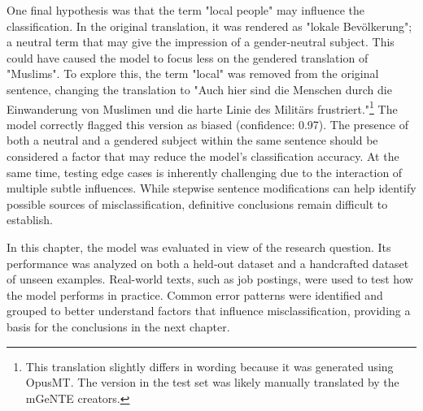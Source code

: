     One final hypothesis was that the term "local people" may influence the classification. In the original translation, it was rendered as "lokale Bevölkerung"; a neutral term that may give the impression of a gender-neutral subject. This could have caused the model to focus less on the gendered translation of "Muslims". To explore this, the term "local" was removed from the original sentence, changing the translation to "Auch hier sind die Menschen durch die Einwanderung von Muslimen und die harte Linie des Militärs frustriert."\footnote{This translation slightly differs in wording because it was generated using OpusMT. The version in the test set was likely manually translated by the mGeNTE creators.} The model correctly flagged this version as biased (confidence: 0.97). The presence of both a neutral and a gendered subject within the same sentence should be considered a factor that may reduce the model’s classification accuracy. At the same time, testing edge cases is inherently challenging due to the interaction of multiple subtle influences. While stepwise sentence modifications can help identify possible sources of misclassification, definitive conclusions remain difficult to establish.

    In this chapter, the model was evaluated in view of the research question. Its performance was analyzed on both a held-out dataset and a handcrafted dataset of unseen examples. Real-world texts, such as job postings, were used to test how the model performs in practice. Common error patterns were identified and grouped to better understand factors that influence misclassification, providing a basis for the conclusions in the next chapter.


 